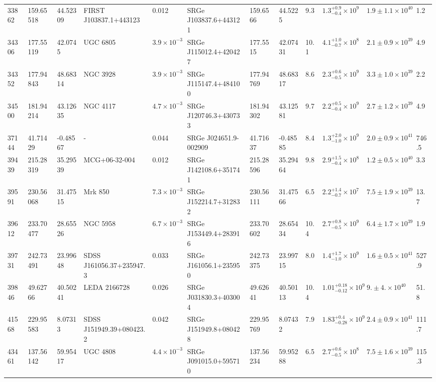 \begin{longtable}{llllllllllll}
33862 & 159.65518 & 44.52309 & FIRST J103837.1+443123 & 0.012 & SRGe J103837.6+443121 & 159.6566 & 44.5225 & 9.3 & $1.3^{+0.9}_{-0.4}\times10^{9}$ & $1.9\pm1.1\times10^{40}$ & 1.2 \\
34306 & 177.55119 & 42.0745 & UGC  6805 & $3.9\times10^{-3}$ & SRGe J115012.4+420427 & 177.5515 & 42.07431 & 10.1 & $4.1^{+1.0}_{-0.7}\times10^{8}$ & $2.1\pm0.9\times10^{39}$ & 4.9 \\
34352 & 177.94843 & 48.68314 & NGC  3928 & $3.9\times10^{-3}$ & SRGe J115147.4+484100 & 177.94769 & 48.68317 & 8.6 & $2.3^{+0.6}_{-0.5}\times10^{9}$ & $3.3\pm1.0\times10^{39}$ & 2.2 \\
34500 & 181.94214 & 43.12635 & NGC  4117 & $4.7\times10^{-3}$ & SRGe J120746.3+430733 & 181.94302 & 43.12581 & 9.7 & $2.2^{+0.5}_{-0.4}\times10^{9}$ & $2.7\pm1.2\times10^{39}$ & 4.9 \\
37144 & 41.71429 & -0.48567 & - & 0.044 & SRGe J024651.9-002909 & 41.71637 & -0.48585 & 8.4 & $1.3^{+2.0}_{-1.0}\times10^{9}$ & $2.0\pm0.9\times10^{41}$ & 746.5 \\
39439 & 215.28319 & 35.29539 & MCG+06-32-004 & 0.012 & SRGe J142108.6+351741 & 215.28596 & 35.29464 & 9.8 & $2.9^{+1.5}_{-0.4}\times10^{8}$ & $1.2\pm0.5\times10^{40}$ & 3.3 \\
39591 & 230.56068 & 31.47515 & Mrk  850 & $7.3\times10^{-3}$ & SRGe J152214.7+312832 & 230.56111 & 31.47566 & 6.5 & $2.2^{+1.4}_{-0.7}\times10^{7}$ & $7.5\pm1.9\times10^{39}$ & 13.7 \\
39612 & 233.70477 & 28.65526 & NGC  5958 & $6.7\times10^{-3}$ & SRGe J153449.4+283916 & 233.70602 & 28.65434 & 10.4 & $2.7^{+0.8}_{-0.5}\times10^{9}$ & $6.4\pm1.7\times10^{39}$ & 1.9 \\
39731 & 242.73491 & 23.99648 & SDSS J161056.37+235947.3 & 0.033 & SRGe J161056.1+235950 & 242.73375 & 23.99715 & 8.0 & $1.4^{+1.7}_{-1.0}\times10^{9}$ & $1.6\pm0.5\times10^{41}$ & 527.9 \\
39846 & 49.62766 & 40.50241 & LEDA 2166728 & 0.026 & SRGe J031830.3+403004 & 49.62641 & 40.50113 & 10.4 & $1.01^{+0.18}_{-0.12}\times10^{9}$ & $9.\pm4.\times10^{40}$ & 51.8 \\
41568 & 229.95583 & 8.07313 & SDSS J151949.39+080423.2 & 0.042 & SRGe J151949.8+080428 & 229.95769 & 8.07432 & 7.9 & $1.83^{+0.4}_{-0.28}\times10^{9}$ & $2.4\pm0.9\times10^{41}$ & 111.7 \\
43461 & 137.56142 & 59.95417 & UGC  4808 & $4.4\times10^{-3}$ & SRGe J091015.0+595710 & 137.56234 & 59.95288 & 6.5 & $2.7^{+0.6}_{-0.5}\times10^{8}$ & $7.5\pm1.6\times10^{39}$ & 115.3 \\

\end{longtable}
